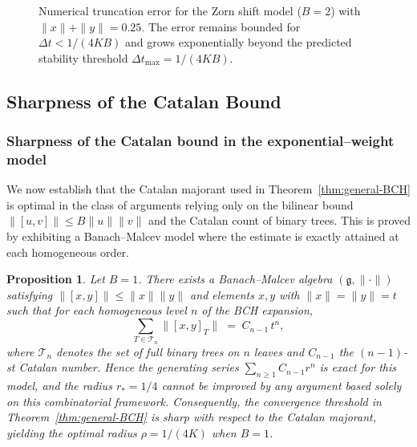 \documentclass[11pt]{amsart}
\numberwithin{equation}{section}
\newtheorem{proposition}[theorem]{Proposition}
\theoremstyle{remark}
\begin{document}
\begin{figure}[htbp]
\centering
{}
\caption{Numerical truncation error for the Zorn shift model ($B=2$) with $\|x\|+\|y\|=0.25$. The error remains bounded for $\Delta t < 1/(4KB)$ and grows exponentially beyond the predicted stability threshold $\Delta t_{\max}=1/(4KB)$.}
\label{fig:numerical-error}
\end{figure}
\subsection{ Sharpness of the Catalan Bound}
\label{sec:sharpness}
\subsubsection{ Sharpness of the Catalan bound in the exponential--weight model}

We now establish that the Catalan majorant used in Theorem~\ref{thm:general-BCH}
is optimal in the class of arguments relying only on the bilinear bound
$\|[u,v]\|\le B\|u\|\|v\|$ and the Catalan count of binary trees.
This is proved by exhibiting a Banach--Malcev model where the estimate
is exactly attained at each homogeneous order.

\begin{proposition}
\label{prop:sharpness-general}
Let $B=1$. There exists a Banach--Malcev algebra $(\mathfrak g,\|\cdot\|)$
satisfying $\|[x,y]\|\le\|x\|\|y\|$
and elements $x,y$ with $\|x\|=\|y\|=t$
such that for each homogeneous level $n$ of the BCH expansion,
\[
\sum_{T\in\mathcal T_n}\big\|[x,y]_T\big\|
\;=\; C_{n-1}\,t^n,
\]
where $\mathcal T_n$ denotes the set of full binary trees on $n$ leaves
and $C_{n-1}$ the $(n-1)$-st Catalan number.
Hence the generating series $\sum_{n\ge1}C_{n-1}r^n$
is exact for this model, and the radius $r_\ast=1/4$
cannot be improved by any argument based solely on this combinatorial framework.
Consequently, the convergence threshold in Theorem~\ref{thm:general-BCH} is sharp with respect to the Catalan majorant, yielding the optimal radius $\rho = 1/(4K)$ when $B=1$.
\end{proposition}
\end{document}
